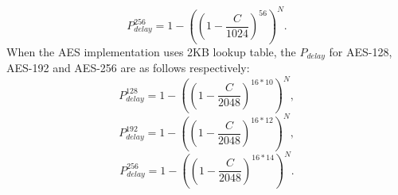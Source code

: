 \begin{equation}
    P_{delay}^{256} = 1- ((1-\frac{C}{1024})^{56})^{N}.
\end{equation}
When the AES implementation uses 2KB lookup table, the $P_{delay}$ for AES-128, AES-192 and AES-256 are as follows respectively:
\begin{equation}
    P_{delay}^{128} = 1- ((1-\frac{C}{2048})^{16*10})^{N},
\end{equation}
\begin{equation}
    P_{delay}^{192} = 1- ((1-\frac{C}{2048})^{16*12})^{N},
\end{equation}
\begin{equation}
    P_{delay}^{256} = 1- ((1-\frac{C}{2048})^{16*14})^{N}.
\end{equation} 